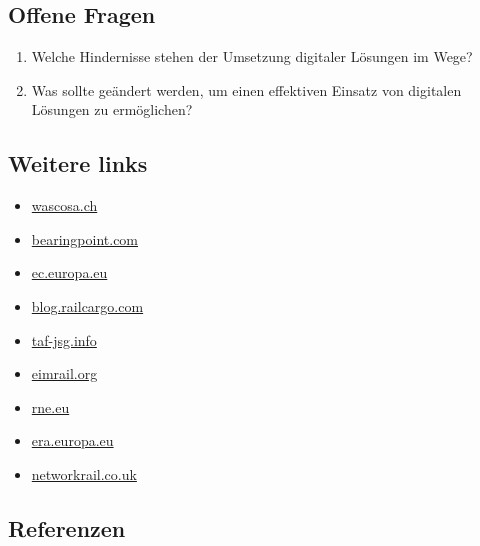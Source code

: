 \documentclass[
]{book}
\providecommand{\tightlist}{%
  \setlength{\itemsep}{0pt}\setlength{\parskip}{0pt}}
\begin{document}
\hypertarget{offene-fragen-27}{%
\subsection*{Offene Fragen}\label{offene-fragen-27}}

\begin{enumerate}
\def\labelenumi{\arabic{enumi}.}
\tightlist
\item
  Welche Hindernisse stehen der Umsetzung digitaler Lösungen im Wege?
\item
  Was sollte geändert werden, um einen effektiven Einsatz von digitalen Lösungen zu ermöglichen?
\end{enumerate}

\hypertarget{weitere-links-25}{%
\subsection*{Weitere links}\label{weitere-links-25}}

\begin{itemize}
\tightlist
\item
  \href{https://www.wascosa.ch/infoletter/2016/wascosa-infoletter-25-en.pdf}{wascosa.ch}
\item
  \href{https://www.bearingpoint.com/files/Digitalization_rail_infrastructure_management_PR.pdf?download=0\&itemId=659400}{bearingpoint.com}
\item
  \href{https://ec.europa.eu/transport/modes/rail/useful-links_de}{ec.europa.eu}
\item
  \href{https://blog.railcargo.com/en/artikel/einzelwagenverkehr}{blog.railcargo.com}
\item
  \href{http://taf-jsg.info/wp-content/uploads/2019/05/RU-IM-Telematics-governance-ToR_V1.3_final-14-05-2019.pdf}{taf-jsg.info}
\item
  \href{https://eimrail.org/}{eimrail.org}
\item
  \href{https://rne.eu/}{rne.eu}
\item
  \href{https://www.era.europa.eu/}{era.europa.eu}
\item
  \href{https://www.networkrail.co.uk/industry-and-commercial/information-for-operators/taf-tap/}{networkrail.co.uk}
\end{itemize}

\hypertarget{referenzen-29}{%
\subsection*{Referenzen}\label{referenzen-29}}
\end{document}
